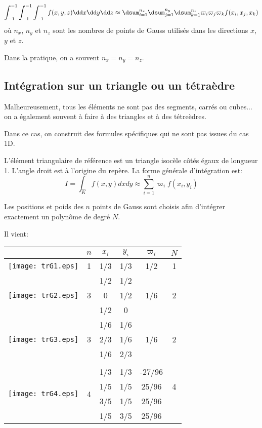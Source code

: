 \begin{equation} \int_{-1}^{-1}\int_{-1}^{-1}\int_{-1}^{-1} f(x,y,z)\dd x\dd y\dd z \approx
\dsum_{i=1}^{n_x}\dsum_{j=1}^{n_y}\dsum_{k=1}^{n_z} \varpi_i\varpi_j\varpi_k f(x_i,x_j,x_k)\end{equation}
où $n_x$, $n_y$ et $n_z$ sont les nombres de points de Gauss utilisés dans
les directions $x$, $y$ et $z$.

Dans la pratique, on a souvent $n_x=n_y=n_z$.


\medskip
\subsection*{Intégration sur un triangle ou un tétraèdre}

Malheureusement, tous les éléments ne sont pas des segments, carrés ou cubes...
on a également souvent à faire à des triangles et à des tétreèdres.

Dans ce cas, on construit des formules spécifiques qui ne sont pas issues du cas 1D.

L'élément triangulaire de référence est un triangle isocèle côtés égaux
de longueur 1. L'angle droit est à l'origine du repère. La forme générale d'intégration est:
\begin{equation}
I=\int_{\hat{K}} f(x,y)dxdy \approx \sum_{i=1}^n \varpi_if(x_i,y_i)
\end{equation}

\medskip
Les positions et poids des $n$ points de Gauss 
sont choisis afin d'intégrer exactement un polynôme de degré $N$.

Il vient:
\begin{center}
\begin{tabular}{cccccc}
 & $n$ & $x_i$ & $y_i$ & $\varpi_i$ & $N$\\
\hline
\texttt{[image: trG1.eps]} & 1 & 1/3 & 1/3 & 1/2 & 1\\
\hline
\multirow{3}{*}{\texttt{[image: trG2.eps]}} &
\multirow{3}{*}{3} & 1/2 & 1/2 & \multirow{3}{*}{1/6} & \multirow{3}{*}{2}\\[+2mm]
&&0&1/2&&\\[+2mm]
&&1/2&0&&\\[+2mm]
\hline
\multirow{3}{*}{\texttt{[image: trG3.eps]}} &
\multirow{3}{*}{3} & 1/6 & 1/6 &  \multirow{3}{*}{1/6} & \multirow{3}{*}{2}\\[+2mm]
&&2/3 & 1/6 &&\\[+2mm]
&&1/6&2/3&&\\[+2mm]
\\
\hline
\multirow{4}{*}{\texttt{[image: trG4.eps]}} & 
\multirow{4}{*}{4} & 1/3 & 1/3 & -27/96 & \multirow{3}{*}{4}\\[+2mm]
&&1/5&1/5&25/96&\\[+2mm]
&&3/5&1/5&25/96&\\[+2mm]
&&1/5&3/5&25/96&\\[+2mm]
\end{tabular}
\end{center}

